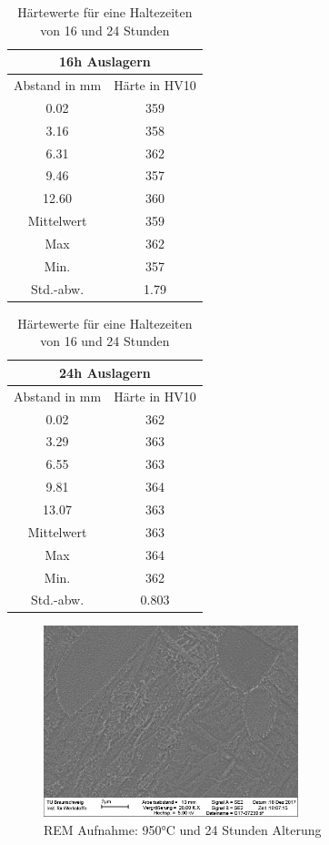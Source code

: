 \documentclass[a4paper, 11pt]{tubsreprt}
\begin{document}
\begin{table}
\begin{tabular}{c|c}
\multicolumn{2}{c}{16h Auslagern} \\
\hline
Abstand in mm &	Härte in HV10 \\
0.02	&	359 \\
3.16	&	358 \\
6.31	&	362 \\
9.46	&	357 \\
12.60	&	360 \\
\hline
Mittelwert	&	359 \\
Max	&	362 \\
Min.	&	357 \\
Std.-abw.	&	1.79 \\
\end{tabular}
\begin{tabular}{c|c}
\multicolumn{2}{c}{24h Auslagern} \\
\hline
Abstand in mm	&	Härte in HV10 \\

0.02	&	362 \\
3.29	&	363 \\
6.55	&	363 \\
9.81	&	364 \\ 
13.07	&	363 \\
\hline
Mittelwert	&	363 \\
Max	&	364 \\
Min.	&	362 \\
Std.-abw.	&	0.803 \\
\end{tabular}
\caption{Härtewerte für eine Haltezeiten von 16 und 24 Stunden}
\label{950 16 24}
\end{table}

\begin{figure}
\centering
\includegraphics[width=0.66\textwidth]{Bilder/REM950C1hWQ520C24hAC.png}
\caption{REM Aufnahme: 950°C und 24 Stunden Alterung}
\label{REM 950C 24h}
\end{figure}
\end{document}
